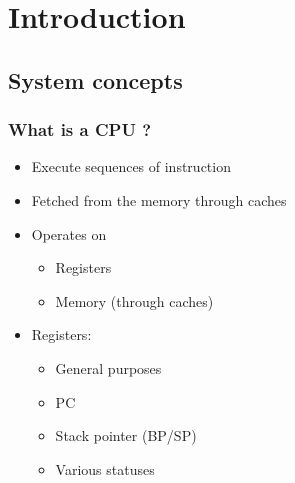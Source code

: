 \section{Introduction}
\label{sec:intro}




\subsection{System concepts}
\label{subsec:sysbase}


\begin{frame}
  \frametitle{What is a CPU ?}

  \begin{itemize}
  \item Execute sequences of instruction
  \item Fetched from the memory through caches
  \item Operates on
    \begin{itemize}
    \item Registers
    \item Memory (through caches)
    \end{itemize}
  \item Registers:
    \begin{itemize}
    \item General purposes
    \item PC
    \item Stack pointer (BP/SP)
    \item Various statuses
    \end{itemize}
  \end{itemize}
\end{frame}




